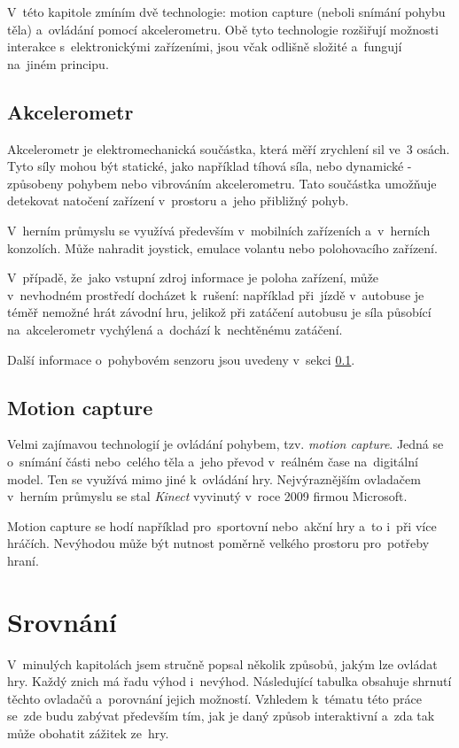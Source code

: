 \documentclass[thesis=B,czech,hidelinks]{FITthesis}[2012/06/26] %
\begin{document}
V~této kapitole zmíním dvě technologie: motion capture (neboli snímání pohybu těla) a~ovládání pomocí akcelerometru. Obě tyto technologie rozšiřují možnosti interakce s~elektronickými zařízeními, jsou včak odlišně složité a~fungují na~jiném principu.

\subsection{Akcelerometr}
\label{section:accelerometer}

Akcelerometr je elektromechanická součástka, která měří zrychlení sil ve~3 osách. Tyto síly mohou být statické, jako například tíhová síla, nebo dynamické - způsobeny pohybem nebo vibrováním akcelerometru.\cite{acc} Tato součástka umožňuje detekovat natočení zařízení v~prostoru a~jeho přibližný pohyb.

V~herním průmyslu se využívá především v~mobilních zařízeních a~v~herních konzolích. Může nahradit joystick, emulace volantu nebo polohovacího zařízení. 

V~případě, že~jako vstupní zdroj informace je poloha zařízení, může v~nevhodném prostředí docházet k~rušení: například při~jízdě v~autobuse je téměř nemožné hrát závodní hru, jelikož při zatáčení autobusu je síla působící na~akcelerometr vychýlená a~dochází k~nechtěnému zatáčení.

Další informace o~pohybovém senzoru jsou uvedeny v~sekci \ref{section:accelerometer}.

\subsection{Motion capture}
\label{section:motion_capture}

Velmi zajímavou technologií je ovládání pohybem, tzv. \textit{motion capture}. Jedná se o~snímání části nebo~celého těla a~jeho převod v~reálném čase na~digitální model. Ten se využívá mimo jiné k~ovládání hry. Nejvýraznějším ovladačem v~herním průmyslu se stal \textit{Kinect} vyvinutý v~roce 2009 firmou Microsoft. \cite{meetthekinect}

Motion capture se hodí například pro~sportovní nebo~akční hry a~to i~při více hráčích. Nevýhodou může být nutnost poměrně velkého prostoru pro~potřeby hraní.

\section{Srovnání}

V~minulých kapitolách jsem stručně popsal několik způsobů, jakým lze ovládat hry. Každý znich má řadu výhod i~nevýhod. Následující tabulka obsahuje shrnutí těchto ovladačů a~porovnání jejich možností. Vzhledem k~tématu této práce se~zde budu zabývat především tím, jak je daný způsob interaktivní a~zda tak může obohatit zážitek ze~hry.
\end{document}
